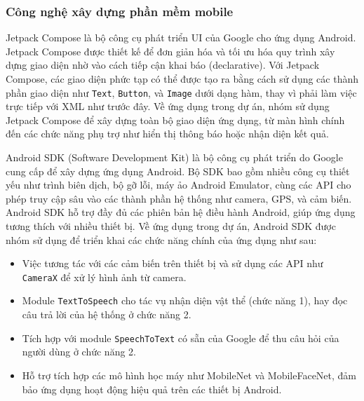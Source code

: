 \documentclass[a4paper,12pt]{article}
\begin{document}
\subsubsection{Công nghệ xây dựng phần mềm mobile}
Jetpack Compose là bộ công cụ phát triển UI của Google cho ứng dụng Android. Jetpack Compose được thiết kế để đơn giản hóa và tối ưu hóa quy trình xây dựng giao diện nhờ vào cách tiếp cận khai báo (declarative). Với Jetpack Compose, các giao diện phức tạp có thể được tạo ra bằng cách sử dụng các thành phần giao diện như \texttt{Text}, \texttt{Button}, và \texttt{Image} dưới dạng hàm, thay vì phải làm việc trực tiếp với XML như trước đây. Về ứng dụng trong dự án, nhóm sử dụng Jetpack Compose để xây dựng toàn bộ giao diện ứng dụng, từ màn hình chính đến các chức năng phụ trợ như hiển thị thông báo hoặc nhận diện kết quả. 

Android SDK (Software Development Kit) là bộ công cụ phát triển do Google cung cấp để xây dựng ứng dụng Android. Bộ SDK bao gồm nhiều công cụ thiết yếu như trình biên dịch, bộ gỡ lỗi, máy ảo Android Emulator, cùng các API cho phép truy cập sâu vào các thành phần hệ thống như camera, GPS, và cảm biến. Android SDK hỗ trợ đầy đủ các phiên bản hệ điều hành Android, giúp ứng dụng tương thích với nhiều thiết bị. Về ứng dụng trong dự án, Android SDK được nhóm sử dụng để triển khai các chức năng chính của ứng dụng như sau:
\begin{itemize}
    \item Việc tương tác với các cảm biến trên thiết bị và sử dụng các API như \texttt{CameraX} để xử lý hình ảnh từ camera.
    \item Module \texttt{TextToSpeech} cho tác vụ nhận diện vật thể (chức năng 1), hay đọc câu trả lời của hệ thống ở chức năng 2.
    \item Tích hợp với module \texttt{SpeechToText} có sẵn của Google để thu câu hỏi của người dùng ở chức năng 2.
    \item Hỗ trợ tích hợp các mô hình học máy như MobileNet và MobileFaceNet, đảm bảo ứng dụng hoạt động hiệu quả trên các thiết bị Android.
\end{itemize}
\end{document}
